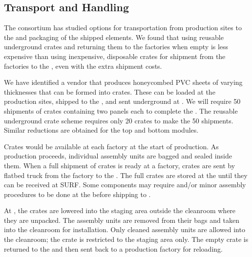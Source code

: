 \subsection{Transport and Handling}
\label{sec:fdsp-hv-transport-transport}

The  consortium has studied %
options for %
transportation from  production sites %
to the  %
and packaging of the shipped elements. 
We found that using reusable underground 
crates and returning them to the factories when empty is less expensive than using inexpensive, disposable crates for shipment from the factories to the ,  
even with the extra shipment costs. %

We have identified a vendor that %
produces honeycombed PVC sheets of varying thicknesses that can be formed into crates. These %
can be loaded at the production sites, %
shipped to the , and sent underground at .  
We will require 50 shipments of crates containing two  panels each to complete the .  %
The reusable underground crate scheme requires only 20 crates to make the 50 shipments. Similar reductions are obtained for the top and bottom  modules. 


Crates would be available at each factory at the start of production. 
As production proceeds, individual assembly units are bagged and sealed inside them.
When a full shipment of crates is ready at a factory, crates are sent by flatbed truck from the factory to the .  The full crates are stored at the  until they can be received at SURF.  Some components may require  and/or minor assembly procedures to be done at the  before shipping to .

At , the crates are lowered into the staging area outside the cleanroom where they are unpacked. The assembly units are removed from their bags and taken into the cleanroom for installation. Only cleaned assembly units are allowed into the cleanroom; the crate is restricted to the staging area only. The empty crate is returned to the  and then sent back to a production factory for reloading. 



